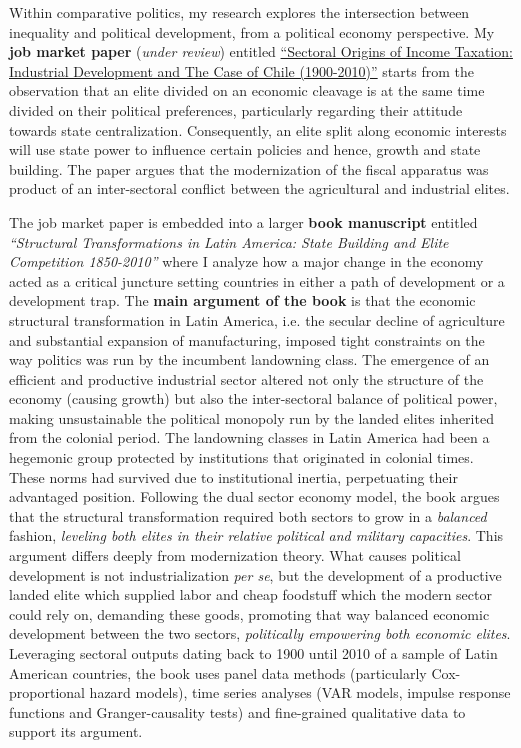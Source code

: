 \documentclass[11pt]{letter} %
\begin{document}
\begin{letter}{}
\vspace{-1.5cm}Within comparative politics, my research explores the intersection between inequality and political development, from a political economy perspective. My {\bf job market paper} (\emph{under review}) entitled \href{https://github.com/hbahamonde/IncomeTaxAdoption/raw/master/Bahamonde_IncomeTaxAdoption.pdf}{``Sectoral Origins of Income Taxation: Industrial Development and The Case of Chile (1900-2010)''} starts from the observation that an elite divided on an economic cleavage is at the same time divided on their political preferences, particularly regarding their attitude towards state centralization. Consequently, an elite split along economic interests will use state power to influence certain policies and hence, growth and state building. The paper argues that the modernization of the fiscal apparatus was product of an inter-sectoral conflict between the agricultural and industrial elites. 

The job market paper is embedded into a larger {\bf book manuscript} entitled \emph{``Structural Transformations in Latin America: State Building and Elite Competition 1850-2010''} where I analyze how a major change in the economy acted as a critical juncture setting countries in either a path of development or a development trap. The {\bf main argument of the book} is that the economic structural transformation in Latin America, i.e. the secular decline of agriculture and substantial expansion of manufacturing, imposed tight constraints on the way politics was run by the incumbent landowning class. The emergence of an efficient and productive industrial sector altered not only the structure of the economy (causing growth) but also the inter-sectoral balance of political power, making unsustainable the political monopoly run by the landed elites inherited from the colonial period. The landowning classes in Latin America had been a hegemonic group protected by institutions that originated in colonial times. These norms had survived due to institutional inertia, perpetuating their advantaged position. Following the dual sector economy model, the book argues that the structural transformation required both sectors to grow in a \emph{balanced} fashion, \emph{leveling both elites in their relative political and military capacities}. This argument differs deeply from modernization theory. What causes political development is not industrialization \emph{per se}, but the development of a productive landed elite which supplied labor and cheap foodstuff which the modern sector could rely on, demanding these goods, promoting that way balanced economic development between the two sectors, \emph{politically empowering both economic elites}. Leveraging sectoral outputs dating back to 1900 until 2010 of a sample of Latin American countries, the book uses panel data methods (particularly Cox-proportional hazard models), time series analyses (VAR models, impulse response functions and Granger-causality tests) and fine-grained qualitative data to support its argument.


\end{letter}
\end{document}

